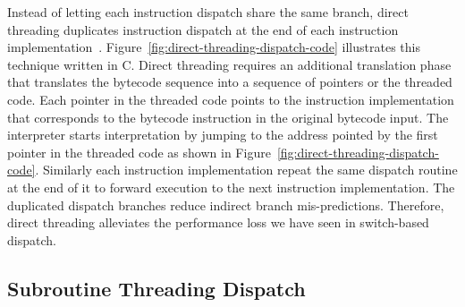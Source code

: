 Instead of letting each instruction dispatch share the same branch, direct threading duplicates instruction dispatch at the end of each instruction implementation~\cite{bell73}.
Figure~\ref{fig:direct-threading-dispatch-code} illustrates this technique written in C.
Direct threading requires an additional translation phase that translates the bytecode sequence into a sequence of pointers or the threaded code.
Each pointer in the threaded code points to the instruction implementation that corresponds to the bytecode instruction in the original bytecode input.
The interpreter starts interpretation by jumping to the address pointed by the first pointer in the threaded code as shown in Figure~\ref{fig:direct-threading-dispatch-code}.
Similarly each instruction implementation repeat the same dispatch routine at the end of it to forward execution to the next instruction implementation.
The duplicated dispatch branches reduce indirect branch mis-predictions.
Therefore, direct threading alleviates the performance loss we have seen in switch-based dispatch.

\subsection{Subroutine Threading Dispatch}

